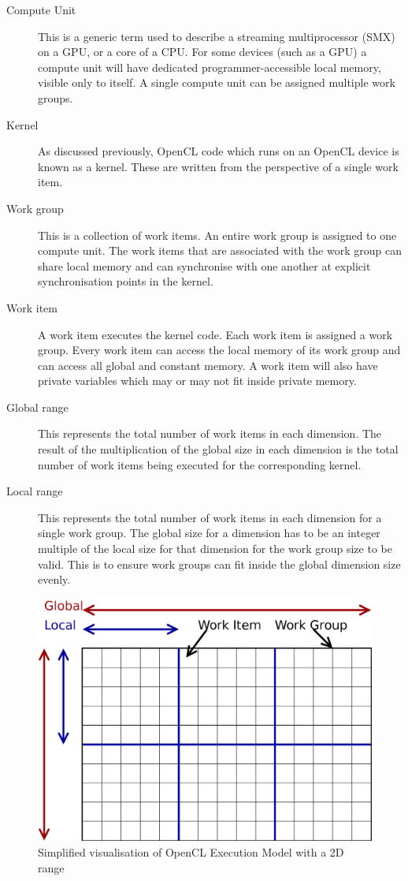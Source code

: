 \begin{description}

\item[Compute Unit] This is a generic term used to describe a streaming
multiprocessor (SMX) on a GPU, or a core of a CPU. For some devices (such as a
GPU) a compute unit will have dedicated programmer-accessible local memory,
visible only to itself. A single compute unit can be assigned multiple work
groups.

\item[Kernel] As discussed previously, OpenCL code which runs on an OpenCL
device is known as a kernel. These are written from the perspective of a single
work item.

\item[Work group] This is a collection of work items. An entire work group is
assigned to one compute unit. The work items that are associated with the work
group can share local memory and can synchronise with one another at explicit
synchronisation points in the kernel.

\item[Work item] A work item executes the kernel code. Each work item is
assigned a work group. Every work item can access the local memory of its work
group and can access all global and constant memory. A work item will also
have private variables which may or may not fit inside private memory.

\item[Global range] This represents the total number of work items in each
dimension. The result of the multiplication of the global size in each dimension
is the total number of work items being executed for the corresponding kernel.

\item[Local range] This represents the total number of work items in each
dimension for a single work group. The global size for a dimension has to be an
integer multiple of the local size for that dimension for the work group size
to be valid. This is to ensure work groups can fit inside the global dimension
size evenly.

\end{description}

\begin{figure}
\centering
\includegraphics[width=0.7\linewidth]{images/openCLExecutionModel.png}
\caption{Simplified visualisation of OpenCL Execution Model with a 2D range}
\label{fig:openCLExecutionModel}
\end{figure}

